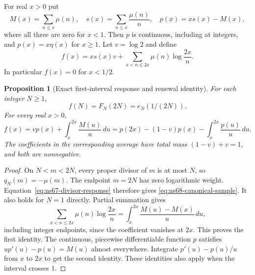 \documentclass[11pt]{article}
\newtheorem{proposition}[theorem]{Proposition}
\theoremstyle{remark}
\begin{document}
For real $x>0$ put
\[
 M(x)=\sum_{n\leq x}\mu(n),\quad s(x)=\sum_{n\leq x}\frac{\mu(n)}n,
 \quad p(x)=x s(x)-M(x),
\]
where all three are zero for $x<1$. Then $p$ is continuous, including
at integers, and $p(x)=x\eta(x)$ for $x\geq1$.
Let $v=\log2$ and define
\begin{equation}
 f(x)=x s(x)v+\sum_{x<n\leq2x}\mu(n)\log\frac{2x}{n}.
 \label{eq:ns68-forcing}
\end{equation}
In particular $f(x)=0$ for $x<1/2$.

\begin{proposition}[Exact first-interval response and renewal identity]
\label{prop:ns68-renewal}
For each integer $N\geq1$,
\begin{equation}
 f(N)=F_N(2N)=e_N(1/(2N)).
 \label{eq:ns68-canonical-sample}
\end{equation}
For every real $x>0$,
\begin{equation}
 f(x)=v p(x)+\int_x^{2x}\frac{M(u)}u\,du
     =p(2x)-(1-v)p(x)-\int_x^{2x}\frac{p(u)}u\,du.
 \label{eq:ns68-renewal-identity}
\end{equation}
The coefficients in the corresponding average have total mass
$(1-v)+v=1$, and both are nonnegative.
\end{proposition}
\begin{proof}
On $N<m<2N$, every proper divisor of $m$ is at most $N$, so
$q_N(m)=-\mu(m)$. The endpoint $m=2N$ has zero logarithmic weight.
Equation~\eqref{eq:ns67-divisor-response} therefore gives
\eqref{eq:ns68-canonical-sample}. It also holds for $N=1$ directly.
Partial summation gives
\[
 \sum_{x<n\leq2x}\mu(n)\log\frac{2x}{n}
       =\int_x^{2x}\frac{M(u)-M(x)}u\,du,
\]
including integer endpoints, since the coefficient vanishes at $2x$.
This proves the first identity. The continuous, piecewise differentiable
function $p$ satisfies $u p'(u)-p(u)=M(u)$ almost everywhere. Integrate
$p'(u)-p(u)/u$ from $x$ to $2x$ to get the second identity. These
identities also apply when the interval crosses $1$.
\end{proof}
\end{document}
